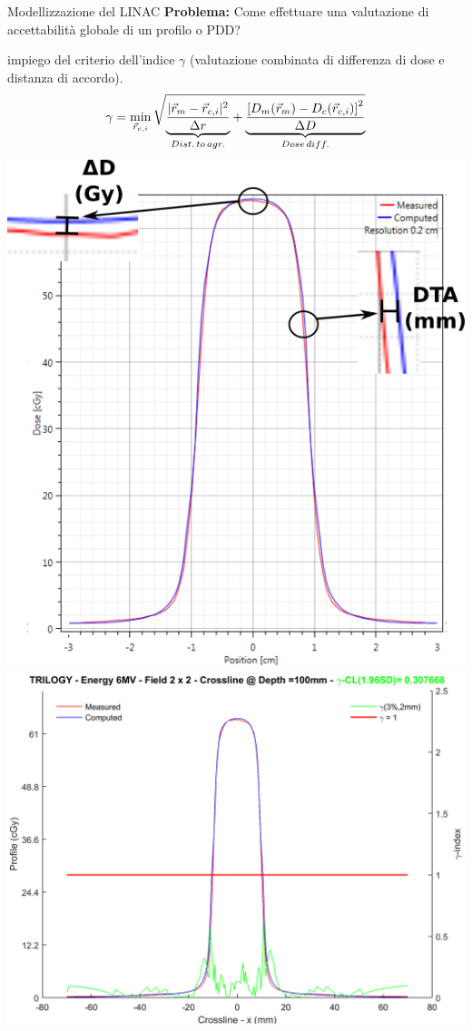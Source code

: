\documentclass{beamer}
\begin{document}
\begin{frame}[t]{Modellizzazione del LINAC}
\scriptsize
\alert{\bf Problema:} Come effettuare una valutazione di accettabilità globale di un profilo o PDD?\\ \vspace{.3cm}

 impiego del criterio dell'indice $\gamma$ (valutazione combinata di differenza di dose e distanza di accordo).
$$\gamma = \min_{\vec{r}_{c,i}} \sqrt{\smash[b]{\underbrace{\frac{|\vec{r}_{m}-\vec{r}_{c,i}|^2}{\Delta r}}_{Dist.\,to\,agr.}}   + \smash[b]{\underbrace{\frac{\left[D_{m}(\vec{r}_{m})-D_{c}(\vec{r}_{c,i})\right]^2}{\Delta D}}_{Dose\,diff.}}}$$
\vspace{.3cm}
\begin{columns}
\includegraphics[width=\textwidth]{./img/gamma_example_prof.png}
\includegraphics[width=\textwidth]{./img/profCrossline_2x2_depth_100.png}

\end{columns}
\end{frame}
\end{document}
